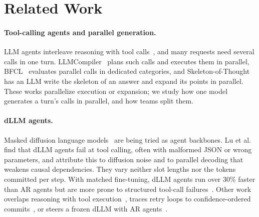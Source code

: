 \section{Related Work}
\label{sec:related}


\paragraph{Tool-calling agents and parallel generation.} LLM agents interleave reasoning with tool calls~\cite{yao2023react,schick2023toolformer}, and many requests need several calls in one turn. LLMCompiler~\cite{kim2024llmcompiler} plans such calls and executes them in parallel, BFCL~\cite{patil2025bfcl} evaluates parallel calls in dedicated categories, and Skeleton-of-Thought~\cite{ning2024skeleton} has an LLM write the skeleton of an answer and expand its points in parallel. These works parallelize execution or expansion; we study how one model generates a turn's calls in parallel, and how teams split them.

\paragraph{dLLM agents.} Masked diffusion language models~\cite{sahoo2024mdlm,nie2025llada,ye2025dream,bie2025llada2} are being tried as agent backbones. Lu et al.~\cite{lu2026bitter} find that dLLM agents fail at tool calling, often with malformed JSON or wrong parameters, and attribute this to diffusion noise and to parallel decoding that weakens causal dependencies. They vary neither slot lengths nor the tokens committed per step. With matched fine-tuning, dLLM agents run over 30\% faster than AR agents but are more prone to structured tool-call failures~\cite{zhen2026dllmagent}. Other work overlaps reasoning with tool execution~\cite{zhao2026dllmsearcher}, traces retry loops to confidence-ordered commits~\cite{qiu2026reverse}, or steers a frozen dLLM with AR agents~\cite{khanal2026agents}.

